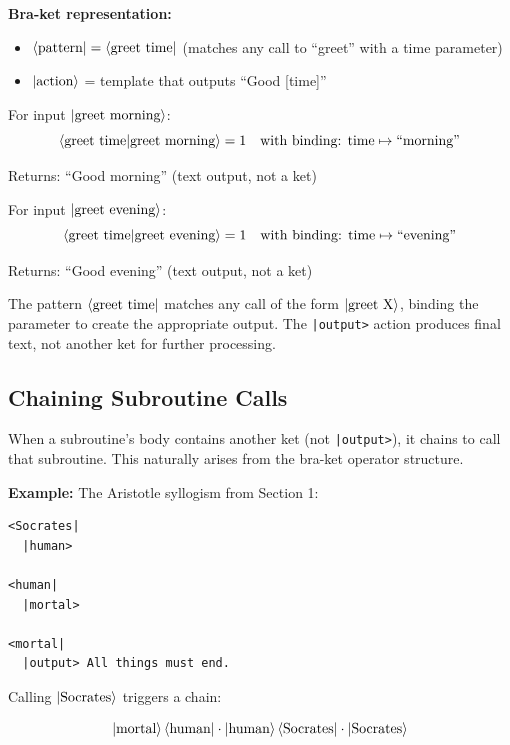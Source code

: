 \documentclass[11pt,a4paper]{article}
\theoremstyle{definition}
\begin{document}
\textbf{Bra-ket representation:}
\begin{itemize}
\item $\bra{\text{pattern}} = \bra{\text{greet time}}$ (matches any call to ``greet'' with a time parameter)
\item $\ket{\text{action}}$ = template that outputs ``Good [time]''
\end{itemize}

For input $\ket{\text{greet morning}}$:
\begin{equation}
\braket{\text{greet time}|\text{greet morning}} = 1 \quad \text{with binding: time} \mapsto \text{``morning''}
\end{equation}

Returns: ``Good morning'' (text output, not a ket)

For input $\ket{\text{greet evening}}$:
\begin{equation}
\braket{\text{greet time}|\text{greet evening}} = 1 \quad \text{with binding: time} \mapsto \text{``evening''}
\end{equation}

Returns: ``Good evening'' (text output, not a ket)

The pattern $\bra{\text{greet time}}$ matches any call of the form $\ket{\text{greet X}}$, binding the parameter to create the appropriate output. The \texttt{|output>} action produces final text, not another ket for further processing.

\subsection{Chaining Subroutine Calls}

When a subroutine's body contains another ket (not \texttt{|output>}), it chains to call that subroutine. This naturally arises from the bra-ket operator structure.

\textbf{Example:} The Aristotle syllogism from Section 1:

\begin{lstlisting}
<Socrates|
  |human>

<human|
  |mortal>

<mortal|
  |output> All things must end.
\end{lstlisting}

Calling $\ket{\text{Socrates}}$ triggers a chain:

\begin{equation}
\ket{\text{mortal}}\bra{\text{human}} \cdot \ket{\text{human}}\bra{\text{Socrates}} \cdot \ket{\text{Socrates}}
\end{equation}
\end{document}
